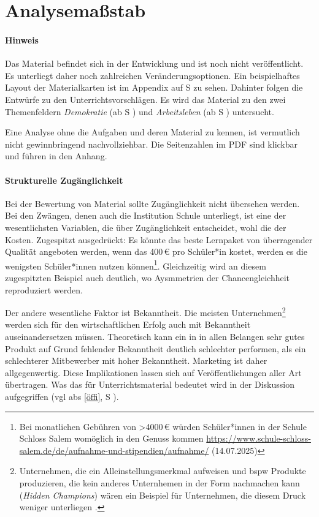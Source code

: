 \section{Analysemaßstab}
\paragraph{Hinweis}
Das Material befindet sich in der Entwicklung  und ist noch nicht veröffentlicht. Es unterliegt daher noch zahlreichen Veränderungsoptionen. 
Ein beispielhaftes Layout der Materialkarten ist im Appendix auf \acrlong{S} \pageref{ANKPrototyp} zu sehen. Dahinter folgen die Entwürfe zu den Unterrichtsvorschlägen. Es wird das Material zu den zwei Themenfeldern \emph{Demokratie} (ab \gls{S} \pageref{DEMOKRATIE-A1}) und \emph{Arbeitsleben} (ab \gls{S} \pageref{ARBEITSLEBEN-A1}) untersucht. 

\noindent Eine Analyse ohne die Aufgaben und deren Material zu kennen, ist vermutlich nicht gewinnbringend nachvollziehbar. Die Seitenzahlen im PDF sind klickbar und führen in den Anhang. 


\paragraph{Strukturelle Zugänglichkeit}
Bei der Bewertung von Material sollte Zugänglichkeit nicht übersehen werden. Bei den Zwängen, denen auch die Institution Schule unterliegt, ist eine der wesentlichsten Variablen, die über Zugänglichkeit entscheidet, wohl die der Kosten.
Zugespitzt ausgedrückt: Es könnte das beste Lernpaket von überragender Qualität angeboten werden, wenn das 400\,€ pro Schüler*in kostet, werden es die wenigsten Schüler*innen nutzen können\footnote{
    Bei monatlichen Gebühren von >4000\,€ würden Schüler*innen in der Schule Schloss Salem womöglich in den Genuss kommen \url{https://www.schule-schloss-salem.de/de/aufnahme-und-stipendien/aufnahme/} (14.07.2025)
}. Gleichzeitig wird an diesem zugespitzten Beispiel auch deutlich, wo Aysmmetrien der Chancengleichheit reproduziert werden. 

Der andere wesentliche Faktor ist Bekanntheit. Die meisten Unternehmen\footnote{
    Unternehmen, die ein Alleinstellungsmerkmal aufweisen und \gls{bspw} Produkte produzieren, die kein anderes Unternhemen in der Form nachmachen kann (\emph{Hidden Champions}) wären ein Beispiel für Unternehmen, die diesem Druck weniger unterliegen \autocite{Simon.2007}. 
} werden sich für den wirtschaftlichen Erfolg auch mit Bekanntheit auseinandersetzen müssen. Theoretisch kann ein in in allen Belangen sehr gutes Produkt auf Grund fehlender Bekanntheit deutlich schlechter performen, als ein schlechterer Mitbewerber mit hoher Bekanntheit.  Marketing ist daher allgegenwertig. Diese Implikationen lassen sich auf Veröffentlichungen aller Art übertragen. Was das für Unterrichtsmaterial bedeutet wird in der Diskussion aufgegriffen (\gls{vgl} \gls{abs} \ref{öffi}, \gls{S} \pageref{öffi}).


